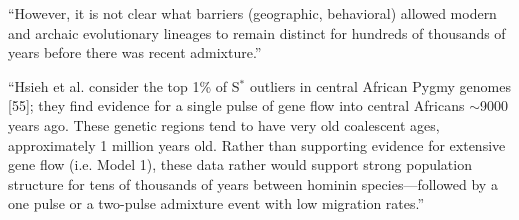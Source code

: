 \documentclass{article}
\begin{document}
``However, it is not clear what barriers (geographic, behavioral)
allowed modern and archaic evolutionary lineages to remain distinct
for hundreds of thousands of years before there was recent
admixture.''

``Hsieh et al. consider the top 1\% of S$^{*}$ outliers in central
African Pygmy genomes [55]; they find evidence for a single pulse of
gene flow into central Africans $\sim$9000 years ago. These genetic
regions tend to have very old coalescent ages, approximately 1 million
years old. Rather than supporting evidence for extensive gene flow
(i.e. Model 1), these data rather would support strong population
structure for tens of thousands of years between hominin
species---followed by a one pulse or a two-pulse admixture event with
low migration rates.''
\end{document}
